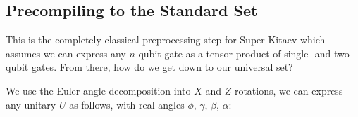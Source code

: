\subsection{Precompiling to the Standard Set}
\label{subsec:precompile}

This is the completely classical preprocessing step for Super-Kitaev which
assumes we can express any $n$-qubit gate as a tensor product of
single- and two-qubit gates.
From there, how do we get down to our universal set?

%
%
%

We use the Euler angle decomposition into $X$ and $Z$ rotations,
we can express any
unitary $U$ as follows, with real angles $\phi$, $\gamma$, $\beta$, $\alpha$:

